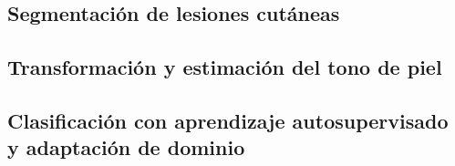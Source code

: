 \subsection{Segmentación de lesiones cutáneas}
\label{sec:desarrollo-segmentacion}



\subsection{Transformación y estimación del tono de piel}
\label{sec:desarrollo-tono}


\subsection{Clasificación con aprendizaje autosupervisado y adaptación de dominio}
\label{sec:desarrollo-clasificador}


